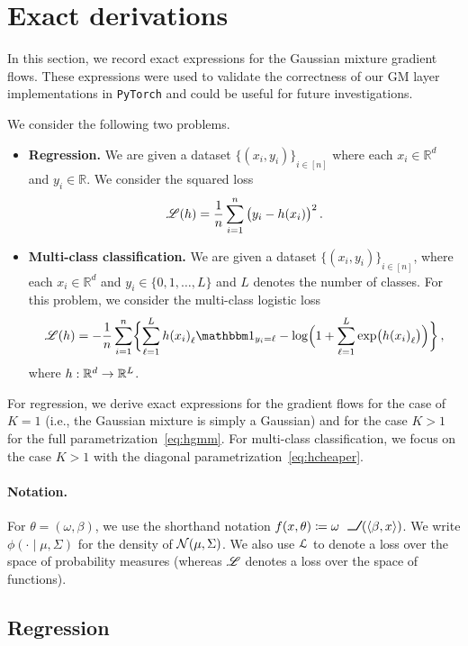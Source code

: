 \documentclass{custom}
\begin{document}
\section{Exact derivations}\label{app:derivations}




In this section, we record exact expressions for the Gaussian mixture gradient flows.
These expressions were used to validate the correctness of our GM layer implementations in \texttt{PyTorch} and could be useful for future investigations.

We consider the following two problems.
\begin{itemize}
\item \textbf{Regression.} We are given a dataset ${\{(x_{i},y_{i})\}}_{i \in [n]}$ where each
$x_{i}\in\mathbb{R}^{d}$ and $y_{i}\in\mathbb{R}$. We consider
the squared loss
\[
\mathscr L(h) = \frac{1}{n} \sum_{i=1}^n {\bigl(y_i - h(x_i)\bigr)}^2\,.
\]
\item \textbf{Multi-class classification.} We are given a dataset ${\{(x_{i},y_{i})\}}_{i\in [n]}$,
where each $x_{i}\in\mathbb{R}^{d}$ and $y_{i}\in\{0,1,\ldots,L\}$ and $L$ denotes the number of classes.
For this problem, we consider the multi-class logistic loss
\[ \ms L(h) = -\frac{1}{n}\sum_{i=1}^{n}\biggl\{ \sum_{\ell=1}^{L} {h(x_i)}_\ell \ind_{y_i=\ell} -\log\Bigl(1+\sum_{\ell=1}^{L}\exp\bigl({h(x_i)}_\ell\bigr)\Bigr)\biggr\}\,,
\]
where $h : \mathbb R^d\to\mathbb R^{L}$.
\end{itemize}

For regression, we derive exact expressions for the gradient flows for the case of $K=1$ (i.e., the Gaussian mixture is simply a Gaussian) and for the case $K > 1$ for the full parametrization~\eqref{eq:hgmm}. For multi-class classification, we focus on the case $K > 1$ with the diagonal parametrization~\eqref{eq:hcheaper}.

\paragraph{Notation.}
For $\theta = (\omega,\beta)$, we use the shorthand notation $f(x,\theta) \deq \omega \ReLU(\langle \beta,x\rangle)$.
We write $\phi(\cdot \mid \mu,\Sigma)$ for the density of $\mathcal N(\mu,\Sigma)$.
We also use $\EuScript{L}$ to denote a loss over the space of probability measures (whereas $\mathscr L$ denotes a loss over the space of functions).


\subsection{Regression}
\end{document}
